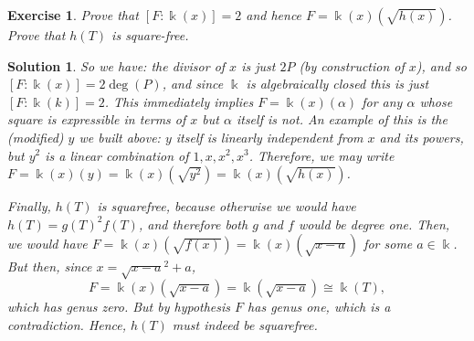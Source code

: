 \documentclass{article}
\newtheorem{ex}{Exercise}
\theoremstyle{nonumberplain}
\newtheorem{sol}{Solution}
\newcommand{\kk}{\Bbbk}
\begin{document}
\begin{ex}
Prove that $[F : \kk(x)] = 2$ and hence $F = \kk(x)(\sqrt{h(x)})$. Prove that $h(T)$ is square-free.
\end{ex}

\begin{sol}
So we have: the divisor of $x$ is just $2P$ (by construction of $x$), and so $[F:\kk(x)] = 2 \deg(P)$, and since $\kk$ is algebraically closed this is just $[F:\kk(k)] = 2$. This immediately implies $F = \kk(x)(\alpha)$ for any $\alpha$ whose square is expressible in terms of $x$ but $\alpha$ itself is not. An example of this is the (modified) $y$ we built above: $y$ itself is linearly independent from $x$ and its powers, but $y^2$ is a linear combination of $1,x,x^2,x^3$. Therefore, we may write $F = \kk(x)(y) = \kk(x)(\sqrt{y^2}) = \kk(x)(\sqrt{h(x)})$.

Finally, $h(T)$ is squarefree, because otherwise we would have $h(T) = g(T)^2 f(T)$, and therefore both $g$ and $f$ would be degree one. Then, we would have $F = \kk(x)(\sqrt{f(x)}) = \kk(x)(\sqrt{x-a})$ for some $a \in \kk$. But then, since $x = \sqrt{x-a}^2 + a$,
\begin{equation}
F = \kk(x)(\sqrt{x-a}) = \kk(\sqrt{x-a}) \cong \kk(T),
\end{equation}
which has genus zero. But by hypothesis $F$ has genus one, which is a contradiction. Hence, $h(T)$ must indeed be squarefree.
\end{sol}
\end{document}

